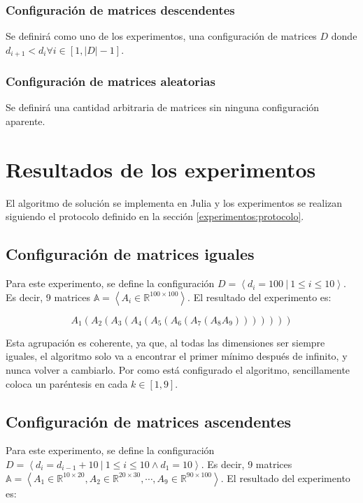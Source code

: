 \documentclass[letter]{article}
\begin{document}
\subsubsection{Configuración de matrices descendentes}

Se definirá como uno de los experimentos, una configuración de matrices $D$ donde $d_{i+1} < d_i \forall i \in [1, |D| - 1]$.

\subsubsection{Configuración de matrices aleatorias}

Se definirá una cantidad arbitraria de matrices sin ninguna configuración aparente.

\section{Resultados de los experimentos} \label{resultados}

El algoritmo de solución se implementa en Julia y los experimentos se realizan siguiendo el protocolo definido en la sección \ref{experimentos:protocolo}.

\subsection{Configuración de matrices iguales}

Para este experimento, se define la configuración $D = \left< d_i = 100 ~|~ 1 \leq i \leq 10 \right>$. Es decir, 9 matrices $\mathbb{A} = \left< A_i \in \mathbb{R}^{100 \times 100} \right>$. El resultado del experimento es: \par

\[ A_1(A_2(A_3(A_4(A_5(A_6(A_7(A_8A_9))))))) \]

Esta agrupación es coherente, ya que, al todas las dimensiones ser siempre iguales, el algoritmo solo va a encontrar el primer mínimo después de infinito, y nunca volver a cambiarlo. Por como está configurado el algoritmo, sencillamente coloca un paréntesis en cada $k \in [1, 9]$.

\subsection{Configuración de matrices ascendentes}

Para este experimento, se define la configuración $D = \left< d_i = d_{i - 1} + 10 ~|~ 1 \leq i \leq 10 \land d_1 = 10 \right>$. Es decir, 9 matrices $\mathbb{A} = \left< A_1 \in \mathbb{R}^{10 \times 20}, A_2 \in \mathbb{R}^{20 \times 30}, \cdots, A_9 \in \mathbb{R}^{90 \times 100} \right>$. El resultado del experimento es: \par
\end{document}
